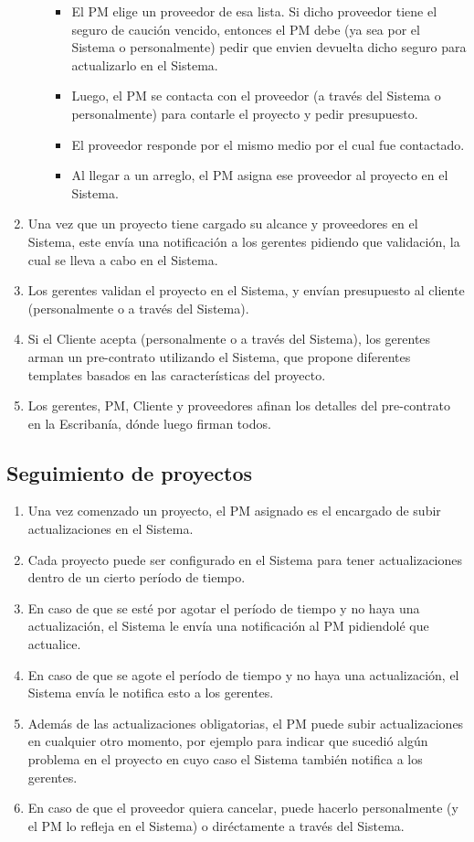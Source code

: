 \begin{enumerate}
\begin{itemize}
\begin{itemize}
                    \item El PM elige un proveedor de esa lista. Si dicho proveedor tiene el seguro de caución vencido, entonces el PM debe (ya sea por el Sistema o personalmente) pedir que envien devuelta dicho seguro para actualizarlo en el Sistema.
                    \item Luego, el PM se contacta con el proveedor (a través del Sistema o personalmente) para contarle el proyecto y pedir presupuesto.
                    \item El proveedor responde por el mismo medio por el cual fue contactado.
                    \item Al llegar a un arreglo, el PM asigna ese proveedor al proyecto en el Sistema.
                \end{itemize}
        \end{itemize}
    \item Una vez que un proyecto tiene cargado su alcance y proveedores en el Sistema, este envía una notificación a los gerentes pidiendo que validación, la cual se lleva a cabo en el Sistema.
    \item Los gerentes validan el proyecto en el Sistema, y envían presupuesto al cliente (personalmente o a través del Sistema).
    \item Si el Cliente acepta (personalmente o a través del Sistema), los gerentes arman un pre-contrato utilizando el Sistema, que propone diferentes templates basados en las características del proyecto.
    \item Los gerentes, PM, Cliente y proveedores afinan los detalles del pre-contrato en la Escribanía, dónde luego firman todos.
\end{enumerate}

\subsection{Seguimiento de proyectos}
\begin{enumerate}
    \item Una vez comenzado un proyecto, el PM asignado es el encargado de subir actualizaciones en el Sistema.
    \item Cada proyecto puede ser configurado en el Sistema para tener actualizaciones dentro de un cierto período de tiempo.
    \item En caso de que se esté por agotar el período de tiempo y no haya una actualización, el Sistema le envía una notificación al PM pidiendolé que actualice.
    \item En caso de que se agote el período de tiempo y no haya una actualización, el Sistema envía le notifica esto a los gerentes.
    \item Además de las actualizaciones obligatorias, el PM puede subir actualizaciones en cualquier otro momento, por ejemplo para indicar que sucedió algún problema en el proyecto en cuyo caso el Sistema también notifica a los gerentes.
    \item En caso de que el proveedor quiera cancelar, puede hacerlo personalmente (y el PM lo refleja en el Sistema) o diréctamente a través del Sistema.
\end{enumerate}

